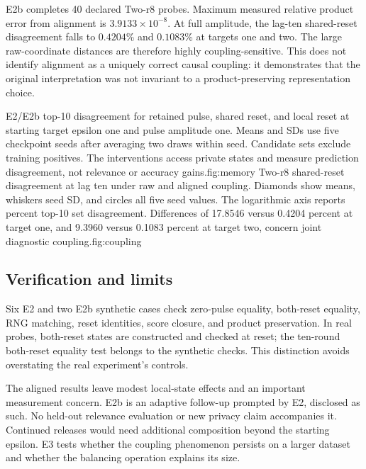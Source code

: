 E2b completes 40 declared Two-r8 probes. Maximum measured relative product
error from alignment is $3.9133\times10^{-8}$. At full amplitude, the lag-ten
shared-reset disagreement falls to $0.4204$\% and $0.1083$\% at targets
one and two. The large raw-coordinate distances are therefore highly
coupling-sensitive. This does not identify alignment as a uniquely correct
causal coupling: it demonstrates that the original interpretation was not
invariant to a product-preserving representation choice.

{E2/E2b top-10 disagreement for retained pulse, shared reset, and local reset
at starting target epsilon one and pulse amplitude one. Means and SDs use
five checkpoint seeds after averaging two draws within seed. Candidate sets
exclude training positives. The interventions access private states and
measure prediction disagreement, not relevance or accuracy gains.}{fig:memory}
{Two-r8 shared-reset disagreement at lag ten under raw and aligned coupling.
Diamonds show means, whiskers seed SD, and circles all five seed values.
The logarithmic axis reports percent top-10 set disagreement. Differences
of 17.8546 versus 0.4204 percent at target one, and 9.3960 versus 0.1083
percent at target two, concern joint diagnostic coupling.}{fig:coupling}

\subsection{Verification and limits}
Six E2 and two E2b synthetic cases check zero-pulse equality, both-reset
equality, RNG matching, reset identities, score closure, and product
preservation. In real probes, both-reset states are constructed and checked
at reset; the ten-round both-reset equality test belongs to the synthetic
checks. This distinction avoids overstating the real experiment's controls.

The aligned results leave modest local-state effects and an important
measurement concern. E2b is an adaptive follow-up prompted by E2, disclosed
as such. No held-out relevance evaluation or new privacy claim accompanies
it. Continued releases would need additional composition beyond the starting
epsilon. E3 tests whether the coupling phenomenon persists on a larger
dataset and whether the balancing operation explains its size.
\FloatBarrier
